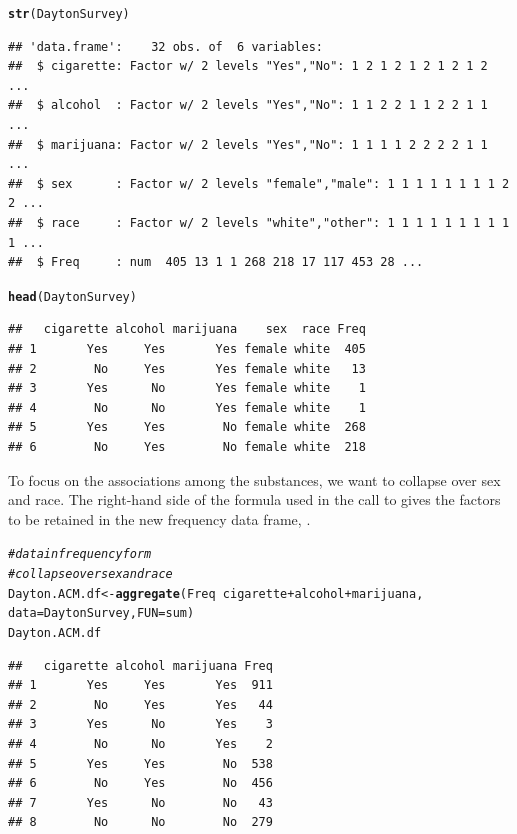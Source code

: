 \documentclass[10pt,twoside]{article}\usepackage[]{graphicx}\usepackage[]{color}
\makeatletter
\newcommand{\hlcom}[1]{\textcolor[rgb]{0.678,0.584,0.686}{\textit{#1}}}%
\newcommand{\hlopt}[1]{\textcolor[rgb]{0,0,0}{#1}}%
\newcommand{\hlstd}[1]{\textcolor[rgb]{0.345,0.345,0.345}{#1}}%
\newcommand{\hlkwb}[1]{\textcolor[rgb]{0.69,0.353,0.396}{#1}}%
\newcommand{\hlkwc}[1]{\textcolor[rgb]{0.333,0.667,0.333}{#1}}%
\newcommand{\hlkwd}[1]{\textcolor[rgb]{0.737,0.353,0.396}{\textbf{#1}}}%
\newenvironment{kframe}{%
 \def\at@end@of@kframe{}%
 \ifinner\ifhmode%
  \def\at@end@of@kframe{\end{minipage}}%
  \begin{minipage}{\columnwidth}%
 \fi\fi%
 \def\FrameCommand##1{\hskip\@totalleftmargin \hskip-\fboxsep
 \colorbox{shadecolor}{##1}\hskip-\fboxsep
     \hskip-\linewidth \hskip-\@totalleftmargin \hskip\columnwidth}%
 \MakeFramed {\advance\hsize-\width
   \@totalleftmargin\z@ \linewidth\hsize
   \@setminipage}}%
 {\par\unskip\endMakeFramed%
 \at@end@of@kframe}
\newenvironment{knitrout}{}{} %
\newcommand{\codefun}[1]{\code{#1()}}
\makeatother
\begin{document}
\begin{knitrout}
\color{fgcolor}\begin{kframe}
\begin{alltt}
\hlkwd{str}\hlstd{(DaytonSurvey)}
\end{alltt}
\begin{verbatim}
## 'data.frame':	32 obs. of  6 variables:
##  $ cigarette: Factor w/ 2 levels "Yes","No": 1 2 1 2 1 2 1 2 1 2 ...
##  $ alcohol  : Factor w/ 2 levels "Yes","No": 1 1 2 2 1 1 2 2 1 1 ...
##  $ marijuana: Factor w/ 2 levels "Yes","No": 1 1 1 1 2 2 2 2 1 1 ...
##  $ sex      : Factor w/ 2 levels "female","male": 1 1 1 1 1 1 1 1 2 2 ...
##  $ race     : Factor w/ 2 levels "white","other": 1 1 1 1 1 1 1 1 1 1 ...
##  $ Freq     : num  405 13 1 1 268 218 17 117 453 28 ...
\end{verbatim}
\begin{alltt}
\hlkwd{head}\hlstd{(DaytonSurvey)}
\end{alltt}
\begin{verbatim}
##   cigarette alcohol marijuana    sex  race Freq
## 1       Yes     Yes       Yes female white  405
## 2        No     Yes       Yes female white   13
## 3       Yes      No       Yes female white    1
## 4        No      No       Yes female white    1
## 5       Yes     Yes        No female white  268
## 6        No     Yes        No female white  218
\end{verbatim}
\end{kframe}
\end{knitrout}


To focus on the associations among the
substances, we want to collapse over sex and race. The right-hand side of the formula
used in the call to \codefun{aggregate} gives the factors to be retained in the
new frequency data frame, .

\begin{knitrout}
\color{fgcolor}\begin{kframe}
\begin{alltt}
\hlcom{# data in frequency form}
\hlcom{# collapse over sex and race}
\hlstd{Dayton.ACM.df} \hlkwb{<-} \hlkwd{aggregate}\hlstd{(Freq} \hlopt{~} \hlstd{cigarette}\hlopt{+}\hlstd{alcohol}\hlopt{+}\hlstd{marijuana,}
                           \hlkwc{data}\hlstd{=DaytonSurvey,} \hlkwc{FUN}\hlstd{=sum)}
\hlstd{Dayton.ACM.df}
\end{alltt}
\begin{verbatim}
##   cigarette alcohol marijuana Freq
## 1       Yes     Yes       Yes  911
## 2        No     Yes       Yes   44
## 3       Yes      No       Yes    3
## 4        No      No       Yes    2
## 5       Yes     Yes        No  538
## 6        No     Yes        No  456
## 7       Yes      No        No   43
## 8        No      No        No  279
\end{verbatim}
\end{kframe}
\end{knitrout}
\end{document}
